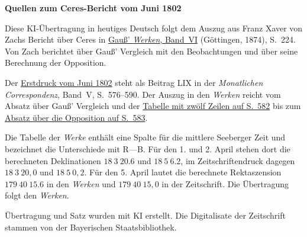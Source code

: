 \clearpage\thispagestyle{empty}
\begin{center}\textbf{Quellen zum Ceres-Bericht vom Juni 1802}\end{center}
\noindent Diese KI-Übertragung in heutiges Deutsch folgt dem Auszug aus Franz Xaver von Zachs Bericht über Ceres in \href{https://gdz.sub.uni-goettingen.de/id/PPN236007467}{Gauß’ \textit{Werken}, Band~VI} (Göttingen, 1874), S.~224. Von Zach berichtet über Gauß’ Vergleich mit den Beobachtungen und über seine Berechnung der Opposition.
\par\smallskip\noindent Der \href{https://api.digitale-sammlungen.de/iiif/image/v2/bsb10538597_00592/full/1450,/0/default.jpg}{Erstdruck vom Juni 1802} steht als Beitrag LIX in der \textit{Monatlichen Correspondenz}, Band~V, S.~576--590. Der Auszug in den \textit{Werken} reicht vom Absatz über Gauß’ Vergleich und der \href{https://api.digitale-sammlungen.de/iiif/image/v2/bsb10538597_00598/full/1450,/0/default.jpg}{Tabelle mit zwölf Zeilen auf S.~582} bis zum \href{https://api.digitale-sammlungen.de/iiif/image/v2/bsb10538597_00599/full/1450,/0/default.jpg}{Absatz über die Opposition auf S.~583}.
\par\smallskip\noindent Die Tabelle der \textit{Werke} enthält eine Spalte für die mittlere Seeberger Zeit und bezeichnet die Unterschiede mit R—B. Für den 1. und 2. April stehen dort die berechneten Deklinationen \(18\ 3\ 20.6\) und \(18\ 5\ 6.2\), im Zeitschriftendruck dagegen \(18\ 3\ 20{,}0\) und \(18\ 5\ 0{,}2\). Für den 5. April lautet die berechnete Rektaszension \(179\ 40\ 15.6\) in den \textit{Werken} und \(179\ 40\ 15{,}0\) in der Zeitschrift. Die Übertragung folgt den \textit{Werken}.
\par\smallskip\noindent Übertragung und Satz wurden mit KI erstellt. Die Digitalisate der Zeitschrift stammen von der Bayerischen Staatsbibliothek.
\clearpage
